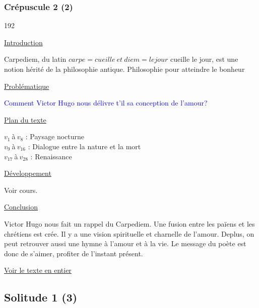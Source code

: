 \documentclass[12pt,a4paper]{article}
\begin{document}
				\subsubsection{Cr\'epuscule 2 (2)}

\begin{dingautolist}{192}

\item \underline{Introduction} \par
	Carpediem, du latin $carpe = cueille~et~diem = le jour$ cueille le jour, est une notion h\'erit\'e de la philosophie antique. Philosophie pour atteindre le bonheur 

\item \underline{Probl\'ematique }\par
		\textcolor{blue}{Comment Victor Hugo nous d\'elivre t'il sa conception de l'amour?}

\item \underline{Plan du texte} \par
		$v_{1}~$\`a$~v_{8}$ : Paysage nocturne\\
        $v_{9}~$\`a$~v_{16}$ : Dialogue entre la nature et la mort\\
        $v_{17}~$\`a$~v_{28}$ : Renaissance

\item \underline{D\'eveloppement} \par
	Voir cours.

\item \underline{Conclusion} \par
	Victor Hugo nous fait un rappel du Carpediem.
Une fusion entre les pa\"iens et les chr\'etiens est cr\'ee. Il y a une vision spirituelle et charnelle de l'amour. Deplus, on peut retrouver aussi une hymne \`a l'amour et \`a la vie.
Le message du po\`ete est donc de s'aimer, profiter de l'instant pr\'esent. 

\end{dingautolist}	
\href{Textes/Crepuscule.pdf}{Voir le texte en entier}
 \newpage
			\subsection{Solitude 1 (3)}
\end{document}
